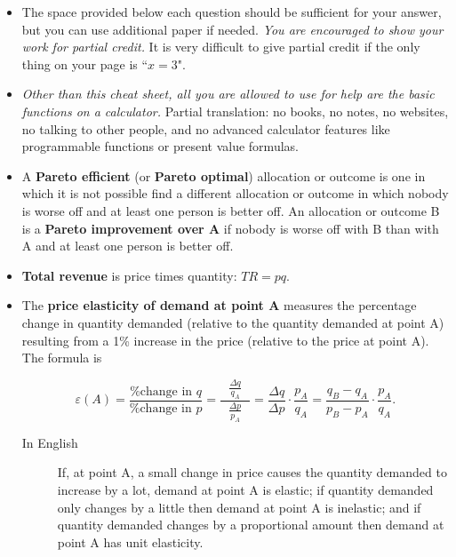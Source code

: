 \documentclass{article}
\begin{document}
\begin{EXAM}

\begin{itemize}

\item The space provided below each question should be sufficient for your answer, but you can use additional paper if needed. \emph{You are encouraged to show your work for partial credit.} It is very difficult to give partial credit if the only thing on your page is ``$x=3$".

\item \emph{Other than this cheat sheet, all you are allowed to use for help are the basic functions on a calculator.} Partial translation: no books, no notes, no websites, no talking to other people, and no advanced calculator features like programmable functions or present value formulas.

\item A \textbf{Pareto efficient} (or \textbf{Pareto optimal}) allocation or outcome is one in which it is not possible find a different allocation or outcome in which nobody is worse off and at least one person is better off. An allocation or outcome B is a \textbf{Pareto improvement over A} if nobody is worse off with B than with A and at least one person is better off.

\item \textbf{Total revenue} is price times quantity: $TR = pq$.

\item The \textbf{price elasticity of demand at point A} measures the percentage change in quantity demanded (relative to the quantity demanded at point A) resulting from a 1\% increase in the price (relative to the price at point A). The formula is

\[
\varepsilon (A)=\frac{\mbox{\% change in } q}{\mbox{\% change in } p} = \displaystyle\frac{\ \ \ \displaystyle\frac{\Delta q}{q_A}\ \ \ }{\displaystyle\frac{\Delta p}{p_A}} =
\frac{\Delta q}{\Delta p}\cdot\frac{p_A}{q_A} =
\frac{q_B-q_A}{p_B-p_A}\cdot\frac{p_A}{q_A}.
\]


\begin{description}

\item [In English] If, at point A, a small change in price causes the quantity demanded to increase by a lot, demand at point A is elastic; if quantity demanded only changes by a little then demand at point A is inelastic; and if quantity demanded changes by a proportional amount then demand at point A has unit elasticity.


\end{description}
\end{itemize}
\end{EXAM}
\end{document}
